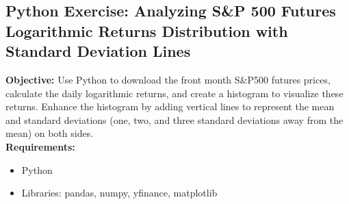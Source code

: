 \documentclass{article}
\begin{document}
\subsection{Python Exercise: Analyzing S\&P 500 Futures Logarithmic Returns Distribution with Standard Deviation Lines}

\textbf{Objective:} Use Python to download the front month S\&P500 futures prices, calculate the daily logarithmic returns, and create a histogram to visualize these returns. Enhance the histogram by adding vertical lines to represent the mean and standard deviations (one, two, and three standard deviations away from the mean) on both sides. \\

\textbf{Requirements:}
\begin{itemize}
    \item Python
    \item Libraries: pandas, numpy, yfinance, matplotlib
\end{itemize}
\end{document}
